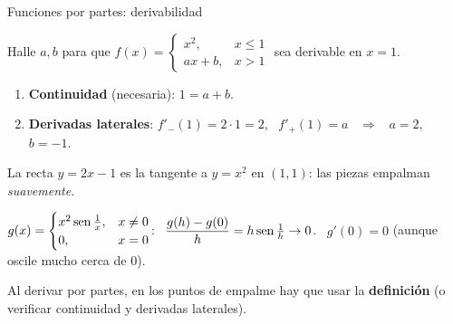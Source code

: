 \documentclass[10pt,aspectratio=169]{beamer}
\begin{document}
\begin{frame}{Funciones por partes: derivabilidad}
  \begin{ejemplo}[5]
    Halle $a,b$ para que $f(x)=\begin{cases}x^2,&x\le1\\ ax+b,&x>1\end{cases}$ sea derivable en $x=1$.
    \begin{enumerate}
      \item \textbf{Continuidad} (necesaria): $1=a+b$.
      \item \textbf{Derivadas laterales}: $f'_-(1)=2\cdot1=2$, \ $f'_+(1)=a$ \ $\Rightarrow$ \ $a=2$, $b=-1$.
    \end{enumerate}
    La recta $y=2x-1$ es la tangente a $y=x^2$ en $(1,1)$: las piezas empalman \emph{suavemente}.
  \end{ejemplo}
  \begin{ejemplo}[6]
    $g(x)=\begin{cases}x^2\operatorname{sen}\frac1x,&x\neq0\\0,&x=0\end{cases}$: \
    $\dfrac{g(h)-g(0)}{h}=h\operatorname{sen}\frac1h\to0$. \ $g'(0)=0$ (aunque oscile mucho cerca de $0$).
  \end{ejemplo}
  \begin{observacion}
    Al derivar por partes, en los puntos de empalme hay que usar la \textbf{definición} (o verificar continuidad y derivadas laterales).
  \end{observacion}
\end{frame}
\end{document}
